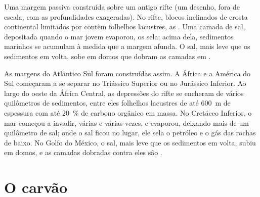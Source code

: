 \begin{omfigure}

{\small Uma margem passiva construída sobre um antigo rifte (um desenho, fora
de escala, com as profundidades exageradas). No rifte, blocos inclinados de
crosta continental limitados por  contêm folhelhos lacustres,
as . Uma camada de sal, depositada quando o mar jovem
evaporou, os sela; acima dela, sedimentos marinhos se acumulam à medida que a
margem afunda. O sal, mais leve que os sedimentos em volta, sobe em domos
que dobram as camadas em .}
\end{omfigure}

As margens do Atlântico Sul foram construídas assim. A África e a América do
Sul começaram a se separar no Triássico Superior ou no Jurássico Inferior. Ao
largo do oeste da África Central, as depressões do rifte se encheram de
vários quilômetros de sedimentos, entre eles folhelhos lacustres de até
\qty{600}{m} de espessura com até \qty{20}{\percent} de carbono orgânico em
massa. No Cretáceo Inferior, o mar começou a invadir, várias e várias vezes,
e evaporou, deixando mais de um quilômetro de sal; onde o sal ficou no lugar,
ele sela o petróleo e o gás das rochas de baixo. No Golfo do México, o sal,
mais leve que os sedimentos em volta, subiu em domos, e as camadas dobradas
contra eles são .

\section{O carvão}

